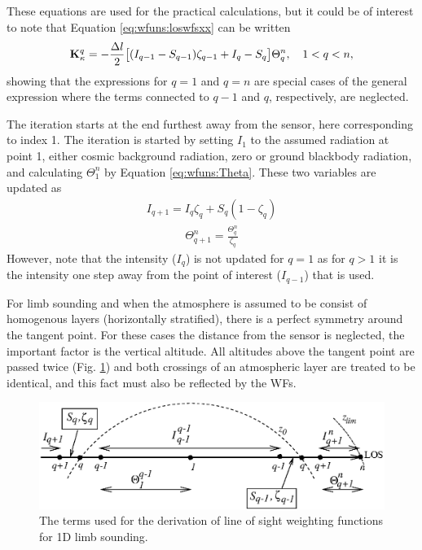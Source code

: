  These equations are used for the practical calculations, but it could
 be of interest to note that Equation \ref{eq:wfuns:loswfsxx} can be
 written
 \begin{equation}
   \mathbf{K}_{\kappa}^q = -\frac{\Delta l}{2} \big[ (I_{q-1}-S_{q-1})\zeta_{q-1}+
           I_q-S_q \big] \Theta^n_q, \quad 1<q<n ,
 \end{equation}
 showing that the expressions for $q=1$ and $q=n$ are special cases of
 the general expression where the terms connected to $q-1$ and $q$,
 respectively, are neglected.

 The iteration starts at the end furthest away from the sensor, here
 corresponding to index 1. The iteration is started by setting $I_1$
 to the assumed radiation at point 1, either cosmic background
 radiation, zero or ground blackbody radiation, and calculating
 $\Theta^n_1$ by Equation \ref{eq:wfuns:Theta}.
 These two variables are updated as
 \begin{eqnarray}
   I_{q+1} = I_q\zeta_{q} + S_{q}(1-\zeta_{q}) \nonumber
 \end{eqnarray}
 \begin{eqnarray}
   \Theta_{q+1}^{n} =  \frac{\Theta_{q}^{n}}{\zeta_q} \nonumber
 \end{eqnarray}
 However, note that the intensity ($I_q$) is not updated for $q=1$ as
 for $q>1$ it is the intensity one step away from the point of
 interest ($I_{q-1}$) that is used.

 
 
 \label{sec:wfuns:limb}
    
 For limb sounding and when the atmosphere is assumed to be consist of
 homogenous layers (horizontally stratified), there is a perfect
 symmetry around the tangent point. For these cases the distance from
 the sensor is neglected, the important factor is the vertical altitude.
 All altitudes above the tangent point are passed twice (Fig. 
 \ref{fig:wfuns:limb}) and both crossings of an atmospheric layer are
 treated to be identical, and this fact must also be reflected by the
 WFs.

 \begin{figure}[t]
  \begin{center}
   \includegraphics*[width=0.95\hsize]{Figs/wf2.eps}
   \caption{The terms used for the derivation of line of sight weighting
            functions for 1D limb sounding.}
   \label{fig:wfuns:limb}  
  \end{center}
 \end{figure}
 
